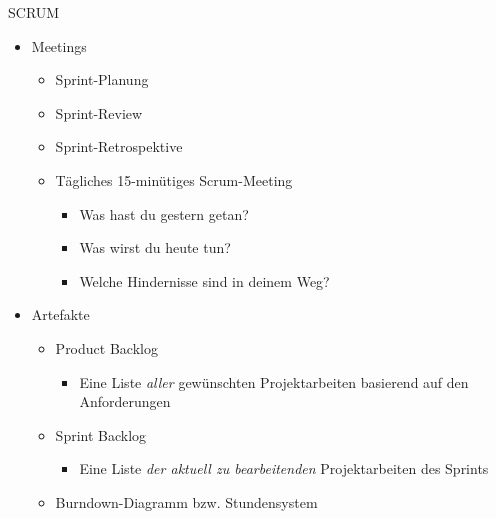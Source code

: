 \begin{defi}{SCRUM}
\begin{itemize}
\begin{itemize}
              \end{itemize}
        \item Meetings
              \begin{itemize}
                  \item Sprint-Planung
                  \item Sprint-Review
                  \item Sprint-Retrospektive
                  \item Tägliches 15-minütiges Scrum-Meeting
                        \begin{itemize}
                            \item Was hast du gestern getan?
                            \item Was wirst du heute tun?
                            \item Welche Hindernisse sind in deinem Weg?
                        \end{itemize}
              \end{itemize}
        \item Artefakte
              \begin{itemize}
                  \item Product Backlog
                        \begin{itemize}
                            \item Eine Liste \emph{aller} gewünschten Projektarbeiten basierend auf den Anforderungen
                        \end{itemize}
                  \item Sprint Backlog
                        \begin{itemize}
                            \item Eine Liste \emph{der aktuell zu bearbeitenden} Projektarbeiten des Sprints
                        \end{itemize}
                  \item Burndown-Diagramm bzw. Stundensystem
              \end{itemize}
    \end{itemize}
\end{defi}

